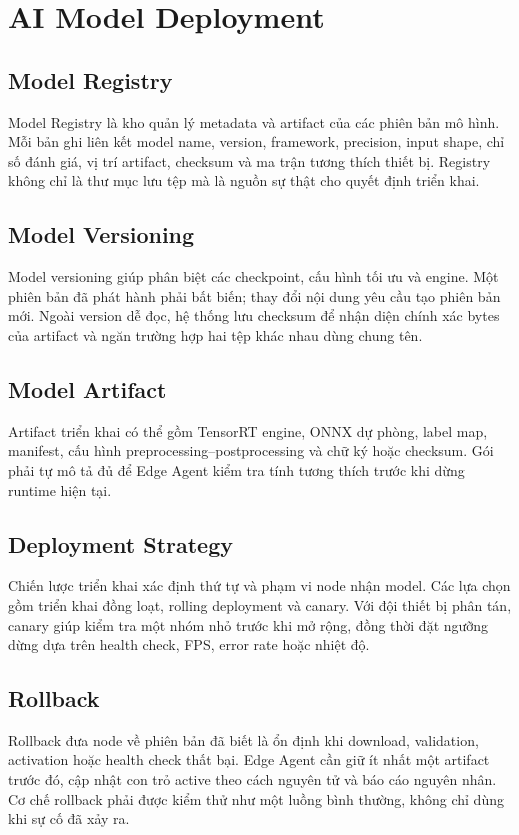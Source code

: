 \section{AI Model Deployment}

\subsection{Model Registry}

Model Registry là kho quản lý metadata và artifact của các phiên bản mô hình.
Mỗi bản ghi liên kết model name, version, framework, precision, input shape, chỉ
số đánh giá, vị trí artifact, checksum và ma trận tương thích thiết bị. Registry
không chỉ là thư mục lưu tệp mà là nguồn sự thật cho quyết định triển khai.

\subsection{Model Versioning}

Model versioning giúp phân biệt các checkpoint, cấu hình tối ưu và engine. Một
phiên bản đã phát hành phải bất biến; thay đổi nội dung yêu cầu tạo phiên bản mới.
Ngoài version dễ đọc, hệ thống lưu checksum để nhận diện chính xác bytes của
artifact và ngăn trường hợp hai tệp khác nhau dùng chung tên.

\subsection{Model Artifact}

Artifact triển khai có thể gồm TensorRT engine, ONNX dự phòng, label map,
manifest, cấu hình preprocessing--postprocessing và chữ ký hoặc checksum. Gói
phải tự mô tả đủ để Edge Agent kiểm tra tính tương thích trước khi dừng runtime
hiện tại.

\subsection{Deployment Strategy}

Chiến lược triển khai xác định thứ tự và phạm vi node nhận model. Các lựa chọn
gồm triển khai đồng loạt, rolling deployment và canary. Với đội thiết bị phân tán,
canary giúp kiểm tra một nhóm nhỏ trước khi mở rộng, đồng thời đặt ngưỡng dừng
dựa trên health check, FPS, error rate hoặc nhiệt độ.

\subsection{Rollback}

Rollback đưa node về phiên bản đã biết là ổn định khi download, validation,
activation hoặc health check thất bại. Edge Agent cần giữ ít nhất một artifact
trước đó, cập nhật con trỏ active theo cách nguyên tử và báo cáo nguyên nhân. Cơ
chế rollback phải được kiểm thử như một luồng bình thường, không chỉ dùng khi
sự cố đã xảy ra.